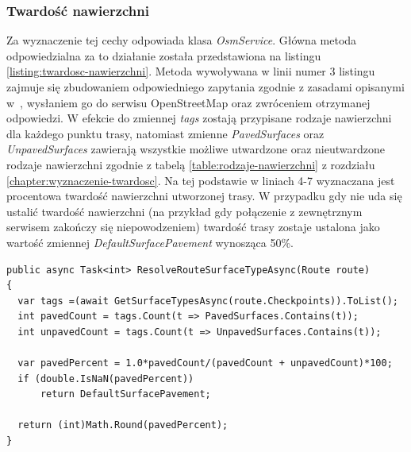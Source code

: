 \subsubsection{Twardość nawierzchni}
Za wyznaczenie tej cechy odpowiada klasa \textit{OsmService}. Główna metoda odpowiedzialna za to działanie została przedstawiona na listingu \ref{listing:twardosc-nawierzchni}. Metoda wywoływana w linii numer 3 listingu zajmuje się zbudowaniem odpowiedniego zapytania zgodnie z zasadami opisanymi w~\cite{osm-docs-wiki}, wysłaniem go do serwisu OpenStreetMap \cite{osm} oraz zwróceniem otrzymanej odpowiedzi. W efekcie do zmiennej \textit{tags} zostają przypisane rodzaje nawierzchni dla każdego punktu trasy, natomiast zmienne \textit{PavedSurfaces} oraz \textit{UnpavedSurfaces} zawierają wszystkie możliwe utwardzone oraz nieutwardzone rodzaje nawierzchni zgodnie z tabelą \ref{table:rodzaje-nawierzchni} z rozdziału \ref{chapter:wyznaczenie-twardosc}. Na tej podstawie w liniach 4-7 wyznaczana jest procentowa twardość nawierzchni utworzonej trasy. 
W przypadku gdy nie uda się ustalić twardość nawierzchni (na przykład gdy połączenie z zewnętrznym serwisem zakończy się niepowodzeniem) twardość trasy zostaje ustalona jako wartość zmiennej \textit{DefaultSurfacePavement} wynosząca 50\%.
\begin{lstlisting}[caption={Wyznaczenie twardości nawierzchni},label=listing:twardosc-nawierzchni]
public async Task<int> ResolveRouteSurfaceTypeAsync(Route route)
{
  var tags =(await GetSurfaceTypesAsync(route.Checkpoints)).ToList();
  int pavedCount = tags.Count(t => PavedSurfaces.Contains(t));
  int unpavedCount = tags.Count(t => UnpavedSurfaces.Contains(t));

  var pavedPercent = 1.0*pavedCount/(pavedCount + unpavedCount)*100;
  if (double.IsNaN(pavedPercent))
      return DefaultSurfacePavement;

  return (int)Math.Round(pavedPercent);
}
\end{lstlisting}

